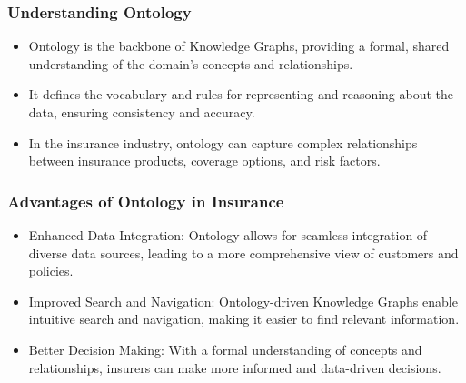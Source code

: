 \begin{frame}[fragile]
\frametitle{Understanding Ontology}
\begin{itemize}
\item Ontology is the backbone of Knowledge Graphs, providing a formal, shared understanding of the domain's concepts and relationships.
\item It defines the vocabulary and rules for representing and reasoning about the data, ensuring consistency and accuracy.
\item In the insurance industry, ontology can capture complex relationships between insurance products, coverage options, and risk factors.
\end{itemize}
\end{frame}

\begin{frame}[fragile]
\frametitle{Advantages of Ontology in Insurance}
\begin{itemize}
\item Enhanced Data Integration: Ontology allows for seamless integration of diverse data sources, leading to a more comprehensive view of customers and policies.
\item Improved Search and Navigation: Ontology-driven Knowledge Graphs enable intuitive search and navigation, making it easier to find relevant information.
\item Better Decision Making: With a formal understanding of concepts and relationships, insurers can make more informed and data-driven decisions.
\end{itemize}
\end{frame}

